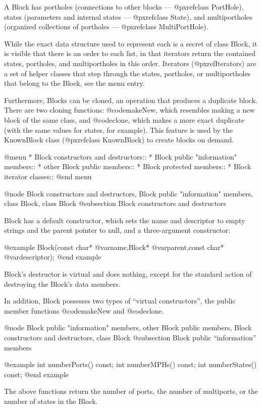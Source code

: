 A Block has portholes (connections to other blocks
--- @pxref{class PortHole}),
states (parameters and internal states --- @pxref{class State}),
and multiportholes (organized collections of portholes
--- @pxref{class MultiPortHole}).

While the exact data structure used to represent each is a secret of
class Block, it is visible that there is an order to each list, in that
iterators return the contained states, portholes, and multiportholes in
this order.  Iterators (@pxref{Iterators}) are a set of helper classes
that step through the states, portholes, or multiportholes that belong
to the Block, see the menu entry.

Furthermore, Blocks can be cloned, an operation that produces a
duplicate block.  There are two cloning functions: @code{makeNew},
which resembles making a new block of the same class, and @code{clone},
which makes a more exact duplicate (with the same values for states,
for example).  This feature is used by the KnownBlock class
(@pxref{class KnownBlock}) to create blocks on demand.

@menu
* Block constructors and destructors::
* Block public "information" members::
* other Block public members::
* Block protected members::
* Block iterator classes::
@end menu

@node Block constructors and destructors, Block public "information" members, class Block, class Block
@subsection Block constructors and destructors

Block has a default constructor, which sets the name and
descriptor to empty strings and the parent pointer to null, and a
three-argument constructor:

@example
Block(const char* @var{name},Block* @var{parent},const char* @var{descriptor});
@end example

Block's destructor is virtual and does nothing, except for the standard
action of destroying the Block's data members.

In addition, Block possesses two types of ``virtual constructors'', the
public member functions @code{makeNew} and @code{clone}.

@node Block public "information" members, other Block public members, Block constructors and destructors, class Block
@subsection Block public ``information'' members

@example
int numberPorts() const;
int numberMPHs() const;
int numberStates() const;
@end example

The above functions return the number of ports, the number of
multiports, or the number of states in the Block.

